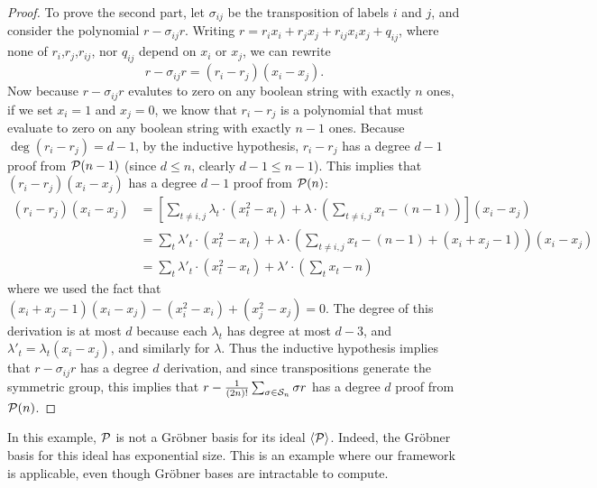 \begin{proof}
To prove the second part, let $\sigma_{ij}$ be the transposition of labels $i$ and $j$, and consider the polynomial $r - \sigma_{ij}r$. Writing $r = r_ix_i + r_jx_j + r_{ij}x_ix_j + q_{ij}$, where none of $r_i$,$r_j$,$r_{ij}$, nor $q_{ij}$ depend on $x_i$ or $x_j$, we can rewrite
\[r - \sigma_{ij}r = (r_i - r_j)(x_i - x_j).\]
Now because $r - \sigma_{ij}r$ evalutes to zero on any boolean string with exactly $n$ ones, if we set $x_i = 1$ and $x_j = 0$, we know that $r_i - r_j$ is a polynomial that must evaluate to zero on any boolean string with exactly $n-1$ ones. Because $\deg (r_i - r_j) = d-1$, by the inductive hypothesis, $r_i - r_j$ has a degree $d-1$ proof from $\mathcal P(n-1)$ (since $d \leq n$, clearly $d-1 \leq n-1$). This implies that $(r_i - r_j)(x_i - x_j)$ has a degree $d-1$ proof from $\mathcal P(n)$:
\begin{align*}
(r_i - r_j)(x_i - x_j) &= \left[\sum_{t \neq i,j} \lambda_t\cdot (x_t^2 - x_t) + \lambda \cdot \left(\sum_{t \neq i,j} x_t - (n-1)\right)\right](x_i - x_j) \\
&= \sum_{t} \lambda'_t \cdot (x_t^2 - x_t) + \lambda \cdot \left(\sum_{t \neq i,j} x_t - (n-1) + (x_i + x_j - 1)\right)(x_i - x_j)\\
&= \sum_t \lambda'_t \cdot (x_t^2 - x_t) +\lambda' \cdot \left(\sum_t x_t - n\right)
\end{align*}
where we used the fact that $(x_i + x_j - 1)(x_i - x_j) - (x_i^2 - x_i) + (x_j^2 - x_j) = 0$. The degree of this derivation is at most $d$ because each $\lambda_t$ has degree at most $d-3$, and $\lambda'_t = \lambda_t(x_i - x_j)$, and similarly for $\lambda$. Thus the inductive hypothesis implies that $r - \sigma_{ij}r$ has a degree $d$ derivation, and since transpositions generate the symmetric group, this implies that $r - \frac{1}{(2n)!}\sum_{\sigma \in \mathcal S_n} \sigma r$ has a degree $d$ proof from $\mathcal P(n)$.
\end{proof}

\begin{remark}
In this example, $\mathcal P$ is not a Gr\"obner basis for its ideal $\langle \mathcal P \rangle$. 
%
Indeed, the Gr\"obner basis for this ideal has exponential size. This is an example where our framework is applicable, even though Gr\"obner bases are intractable to compute. 
\end{remark}

